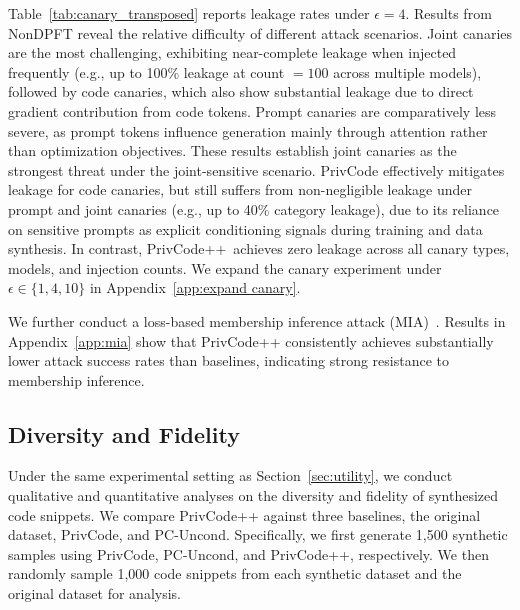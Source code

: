 \documentclass{article}
\theoremstyle{plain}
\theoremstyle{definition}
\theoremstyle{remark}
\def \toolname{PrivCode++}
\begin{document}
{\begin{figure}[t]
    \vspace{-4mm}
    \label{fig:hyper_epsilon}
\end{figure}


Table~\ref{tab:canary_transposed} reports leakage rates under $\epsilon=4$. Results from NonDPFT reveal the relative difficulty of different attack scenarios. Joint canaries are the most challenging, exhibiting near-complete leakage when injected frequently (e.g., up to 100\% leakage at count $=100$ across multiple models), followed by code canaries, which also show substantial leakage due to direct gradient contribution from code tokens. Prompt canaries are comparatively less severe, as prompt tokens influence generation mainly through attention rather than optimization objectives. These results establish joint canaries as the strongest threat under the joint-sensitive scenario. PrivCode effectively mitigates leakage for code canaries, but still suffers from non-negligible leakage under prompt and joint canaries (e.g., up to 40\% category leakage), due to its reliance on sensitive prompts as explicit conditioning signals during training and data synthesis. In contrast, \toolname \ achieves zero leakage across all canary types, models, and injection counts. 
We expand the canary experiment under $\epsilon \in \{1,4,10\}$ in Appendix~\ref{app:expand canary}.

We further conduct a loss-based membership inference attack (MIA)~\cite{shokri2017membership}. Results in Appendix~\ref{app:mia} show that \toolname{} consistently achieves substantially lower attack success rates than baselines, indicating strong resistance to membership inference.




















\subsection{Diversity and Fidelity}
\label{sec:diversity and fidelity}

Under the same experimental setting as Section~\ref{sec:utility}, we conduct qualitative and quantitative analyses on the diversity and fidelity of synthesized code snippets. We compare \toolname{} against three baselines, the original dataset, PrivCode, and PC-Uncond. Specifically, we first generate 1{,}500 synthetic samples using PrivCode, PC-Uncond, and \toolname{}, respectively. We then randomly sample 1{,}000 code snippets from each synthetic dataset and the original dataset for analysis.

}
\end{document}
